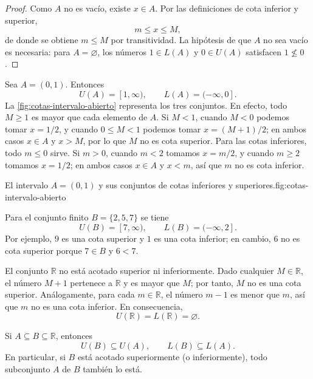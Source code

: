 \begin{proof}
Como $A$ no es vacío, existe $x\in A$. Por las definiciones de cota inferior y superior,
\[
 m\leq x\leq M,
\]
de donde se obtiene $m\leq M$ por transitividad. La hipótesis de que $A$ no sea vacío es necesaria: para $A=\varnothing$, los números $1\in L(A)$ y $0\in U(A)$ satisfacen $1\not\leq0$.
\end{proof}

\begin{example}
Sea $A=(0,1)$. Entonces
\[
 U(A)=[1,\infty),\qquad L(A)=(-\infty,0].
\]
La \cref{fig:cotas-intervalo-abierto} representa los tres conjuntos. En efecto, todo $M\geq1$ es mayor que cada elemento de $A$. Si $M<1$, cuando $M<0$ podemos tomar $x=1/2$, y cuando $0\leq M<1$ podemos tomar $x=(M+1)/2$; en ambos casos $x\in A$ y $x>M$, por lo que $M$ no es cota superior. Para las cotas inferiores, todo $m\leq0$ sirve. Si $m>0$, cuando $m<2$ tomamos $x=m/2$, y cuando $m\geq2$ tomamos $x=1/2$; en ambos casos $x\in A$ y $x<m$, así que $m$ no es cota inferior.
\end{example}

\begin{figuranotas}{El intervalo $A=(0,1)$ y sus conjuntos de cotas inferiores y superiores.}{fig:cotas-intervalo-abierto}

\end{figuranotas}

\begin{example}
Para el conjunto finito $B=\{2,5,7\}$ se tiene
\[
 U(B)=[7,\infty),\qquad L(B)=(-\infty,2].
\]
Por ejemplo, $9$ es una cota superior y $1$ es una cota inferior; en cambio, $6$ no es cota superior porque $7\in B$ y $6<7$.
\end{example}

\begin{example}
El conjunto $\mathbb{R}$ no está acotado superior ni inferiormente. Dado cualquier $M\in\mathbb{R}$, el número $M+1$ pertenece a $\mathbb{R}$ y es mayor que $M$; por tanto, $M$ no es una cota superior. Análogamente, para cada $m\in\mathbb{R}$, el número $m-1$ es menor que $m$, así que $m$ no es una cota inferior. En consecuencia,
\[
 U(\mathbb{R})=L(\mathbb{R})=\varnothing.
\]
\end{example}

\begin{samepage}
\begin{proposition}
\label{prop:inclusion-cotas}
Si $A\subseteq B\subseteq\mathbb{R}$, entonces
\[
 U(B)\subseteq U(A),\qquad L(B)\subseteq L(A).
\]
En particular, si $B$ está acotado superiormente (o inferiormente), todo subconjunto $A$ de $B$ también lo está.
\end{proposition}
\end{samepage}

